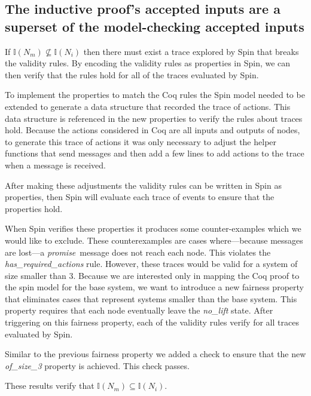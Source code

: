 \documentclass[runningheads]{llncs}
\newcommand{\promise}{\emph{promise}}
\newcommand{\inputset}[1]{\mathds{I}(#1)}
\begin{document}
\subsection{The inductive proof's accepted inputs are a superset of the model-checking accepted inputs}
\label{sec:inputs_smaller}
If $\inputset{N_m} \nsubseteq \inputset{N_i}$ then there must exist a trace explored by Spin that breaks the validity rules. By encoding the validity rules as properties in Spin, we can then verify that the rules hold for all of the traces evaluated by Spin. 

To implement the properties to match the Coq rules the Spin model needed to be extended to generate a data structure that recorded the trace of actions. This data structure is referenced in the new properties to verify the rules about traces hold. Because the actions considered in Coq are all inputs and outputs of nodes, to generate this trace of actions it was only necessary to adjust the helper functions that send messages and then add a few lines to add actions to the trace when a message is received. 

After making these adjustments the validity rules can be written in Spin as properties, then Spin will evaluate each trace of events to ensure that the properties hold. 

When Spin verifies these properties it produces some counter-examples which we would like to exclude. These counterexamples are cases where---because messages are lost---a \promise\ message does not reach each node. This violates the \emph{has\_required\_actions} rule. However, these traces would be valid for a system of size smaller than 3. Because we are interested only in mapping the Coq proof to the spin model for the base system, we want to introduce a new fairness property that eliminates cases that represent systems smaller than the base system. This property requires that each node eventually leave the \emph{no\_lift} state. After triggering on this fairness property, each of the validity rules verify for all traces evaluated by Spin. 

Similar to the previous fairness property we added a check to ensure that the new \emph{of\_size\_3} property is achieved. This check passes.

These results verify that 
$\inputset{N_m} \subseteq \inputset{N_i}$. 
\end{document}
